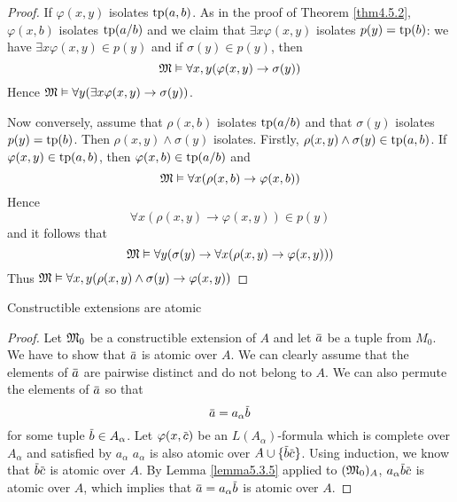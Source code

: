 \documentclass[11pt]{article}
\begin{document}
\begin{proof}
If \(\varphi(x,y)\) isolates \(\operatorname{tp}(a,b)\). As in the proof of Theorem \ref{thm4.5.2}, \(\varphi(x,b)\)
isolates \(\operatorname{tp}(a/b)\) and we claim that \(\exists x\varphi(x,y)\) isolates \(p(y)=\operatorname{tp}(b)\): we
have \(\exists x\varphi(x,y)\in p(y)\) and if \(\sigma(y)\in p(y)\), then
\begin{equation*}
\mathfrak{M}\vDash\forall x,y(\varphi(x,y)\to\sigma(y))
\end{equation*}
Hence \(\mathfrak{M}\vDash\forall y(\exists x\varphi(x,y)\to\sigma(y))\).

Now conversely, assume that \(\rho(x,b)\) isolates \(\operatorname{tp}(a/b)\) and that \(\sigma(y)\)
isolates \(p(y)=\operatorname{tp}(b)\). Then \(\rho(x,y)\wedge\sigma(y)\) isolates. Firstly, \(\rho(x,y)\wedge\sigma(y)\in\operatorname{tp}(a,b)\).
If \(\varphi(x,y)\in\operatorname{tp}(a,b)\), then \(\varphi(x,b)\in\operatorname{tp}(a/b)\) and
\begin{equation*}
\mathfrak{M}\vDash\forall x(\rho(x,b)\to\varphi(x,b))
\end{equation*}
Hence
\begin{equation*}
\forall x(\rho(x,y)\to\varphi(x,y))\in p(y)
\end{equation*}
and it follows that
\begin{equation*}
\mathfrak{M}\vDash\forall y(\sigma(y)\to\forall x(\rho(x,y)\to\varphi(x,y)))
\end{equation*}
Thus \(\mathfrak{M}\vDash\forall x,y(\rho(x,y)\wedge\sigma(y)\to\varphi(x,y))\)
\end{proof}

\begin{corollary}[]
Constructible extensions are atomic
\end{corollary}

\begin{proof}
Let \(\mathfrak{M}_0\) be a constructible extension of \(A\) and let \(\bara\) be a tuple from \(M_0\). We
have to show that \(\bara\) is atomic over \(A\). We can clearly assume that the elements
of \(\bara\) are pairwise distinct and do not belong to \(A\). We can also permute the elements
of \(\bara\) so that
\begin{equation*}
\bara=a_\alpha\barb
\end{equation*}
for some tuple \(\barb\in A_\alpha\). Let \(\varphi(x,\barc)\) be an \(L(A_\alpha)\)-formula which is complete
over \(A_\alpha\) and satisfied by \(a_\alpha\)
\(a_\alpha\) is also atomic over \(A\cup\{\barb\barc\}\). Using induction, we know
that \(\barb\barc\) is atomic over \(A\).
By Lemma \ref{lemma5.3.5} applied
to \((\mathfrak{M}_0)_A\), \(a_\alpha\barb\barc\) is atomic over \(A\), which implies that \(\bara=a_\alpha\barb\) is
atomic over \(A\).
\end{proof}
\end{document}
